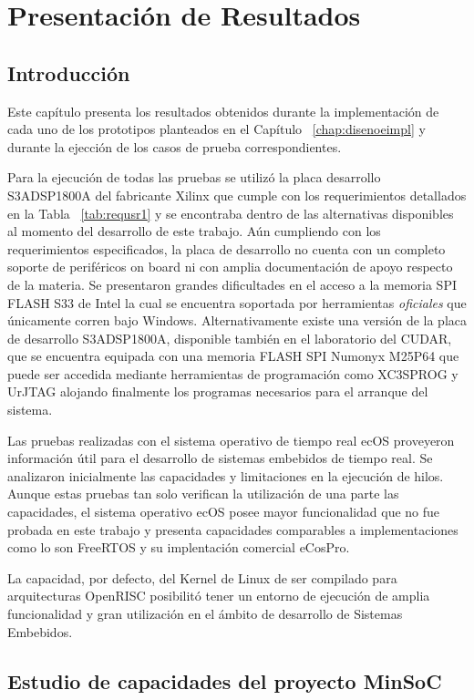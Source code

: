 \chapter{Presentación de Resultados}
	\section{Introducción} 
	
	Este capítulo presenta los resultados obtenidos durante la implementación de cada uno de los prototipos planteados en el Capítulo
	~\ref{chap:disenoeimpl} y durante la ejección de los casos de prueba correspondientes. 
	
	Para la ejecución de todas las pruebas se utilizó la placa desarrollo S3ADSP1800A del fabricante Xilinx que cumple con los requerimientos detallados
	en la Tabla ~\ref{tab:requsr1} y se encontraba dentro de las alternativas disponibles al momento del desarrollo de este trabajo. Aún cumpliendo con
	los requerimientos especificados, la placa de desarrollo no cuenta con un completo soporte de periféricos on board ni con amplia documentación de
	apoyo respecto de la materia. Se presentaron grandes dificultades en el acceso a la memoria SPI FLASH S33 de Intel la cual se encuentra soportada por
	herramientas \textit{oficiales} que únicamente corren bajo Windows. Alternativamente existe una versión de la placa de desarrollo S3ADSP1800A,
	disponible también en el laboratorio del CUDAR, que se encuentra equipada con una memoria FLASH SPI Numonyx M25P64 que puede ser accedida mediante
	herramientas de programación como XC3SPROG y UrJTAG alojando finalmente los programas necesarios para el arranque del sistema.
	
	Las pruebas realizadas con el sistema operativo de tiempo real ecOS proveyeron información útil para el desarrollo de sistemas embebidos de tiempo
	real. Se analizaron inicialmente las capacidades y limitaciones en la ejecución de hilos. Aunque estas pruebas tan solo verifican la utilización de
	una parte las capacidades, el sistema operativo ecOS posee mayor funcionalidad que no fue probada en este trabajo y presenta capacidades comparables
	a implementaciones como lo son FreeRTOS y su implentación comercial eCosPro.
	
	La capacidad, por defecto, del Kernel de Linux de ser compilado para arquitecturas OpenRISC posibilitó tener un entorno de ejecución de amplia
	funcionalidad y gran utilización en el ámbito de desarrollo de Sistemas Embebidos.  
	
	\section{Estudio de capacidades del proyecto MinSoC}


